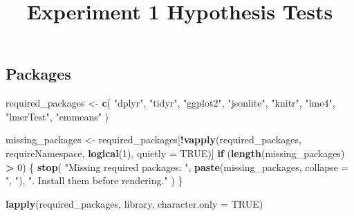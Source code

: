 \documentclass[
]{article}
\title{Experiment 1 Hypothesis Tests}
\author{}
\date{\vspace{-2.5em}}
\newenvironment{Shaded}{\begin{snugshade}}{\end{snugshade}}
\newcommand{\AttributeTok}[1]{\textcolor[rgb]{0.13,0.29,0.53}{#1}}
\newcommand{\ConstantTok}[1]{\textcolor[rgb]{0.56,0.35,0.01}{#1}}
\newcommand{\ControlFlowTok}[1]{\textcolor[rgb]{0.13,0.29,0.53}{\textbf{#1}}}
\newcommand{\DecValTok}[1]{\textcolor[rgb]{0.00,0.00,0.81}{#1}}
\newcommand{\FunctionTok}[1]{\textcolor[rgb]{0.13,0.29,0.53}{\textbf{#1}}}
\newcommand{\NormalTok}[1]{#1}
\newcommand{\OtherTok}[1]{\textcolor[rgb]{0.56,0.35,0.01}{#1}}
\newcommand{\SpecialCharTok}[1]{\textcolor[rgb]{0.81,0.36,0.00}{\textbf{#1}}}
\newcommand{\StringTok}[1]{\textcolor[rgb]{0.31,0.60,0.02}{#1}}
\begin{document}
\maketitle

\setlength{\tabcolsep}{10pt}

\subsection{Packages}\label{packages}

\begin{Shaded}
\begin{Highlighting}[]
\NormalTok{required\_packages }\OtherTok{\textless{}{-}} \FunctionTok{c}\NormalTok{(}
  \StringTok{"dplyr"}\NormalTok{,}
  \StringTok{"tidyr"}\NormalTok{,}
  \StringTok{"ggplot2"}\NormalTok{,}
  \StringTok{"jsonlite"}\NormalTok{,}
  \StringTok{"knitr"}\NormalTok{,}
  \StringTok{"lme4"}\NormalTok{,}
  \StringTok{"lmerTest"}\NormalTok{,}
  \StringTok{"emmeans"}
\NormalTok{)}

\NormalTok{missing\_packages }\OtherTok{\textless{}{-}}\NormalTok{ required\_packages[}\SpecialCharTok{!}\FunctionTok{vapply}\NormalTok{(required\_packages, requireNamespace, }\FunctionTok{logical}\NormalTok{(}\DecValTok{1}\NormalTok{), }\AttributeTok{quietly =} \ConstantTok{TRUE}\NormalTok{)]}
\ControlFlowTok{if}\NormalTok{ (}\FunctionTok{length}\NormalTok{(missing\_packages) }\SpecialCharTok{\textgreater{}} \DecValTok{0}\NormalTok{) \{}
  \FunctionTok{stop}\NormalTok{(}
    \StringTok{"Missing required packages: "}\NormalTok{,}
    \FunctionTok{paste}\NormalTok{(missing\_packages, }\AttributeTok{collapse =} \StringTok{", "}\NormalTok{),}
    \StringTok{". Install them before rendering."}
\NormalTok{  )}
\NormalTok{\}}

\FunctionTok{lapply}\NormalTok{(required\_packages, library, }\AttributeTok{character.only =} \ConstantTok{TRUE}\NormalTok{)}
\end{Highlighting}
\end{Shaded}
\end{document}

